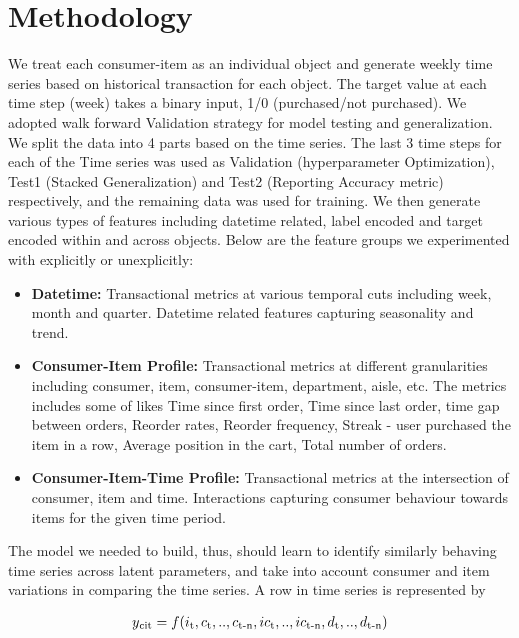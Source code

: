 \section{Methodology}
We treat each consumer-item as an individual object and generate weekly time series based on historical transaction for 
each object. The target value at each time step (week) takes a binary input, 1/0 (purchased/not purchased).
We adopted walk forward Validation strategy for model testing and generalization. We split the data into 4 parts
based on the time series. The last 3 time steps for each of the Time series was used as Validation (hyperparameter Optimization),
Test1 (Stacked Generalization) and Test2 (Reporting Accuracy metric) respectively, and the remaining data was used for training.
We then generate various types of features including datetime related, label encoded and target encoded 
within and across objects. Below are the feature groups we experimented with explicitly or unexplicitly:
\begin{itemize}
\item {\bf Datetime:} Transactional metrics at various temporal cuts including week, month and quarter. 
Datetime related features capturing seasonality and trend.
\item {\bf Consumer-Item Profile:} Transactional metrics at different granularities including consumer, item,
consumer-item, department, aisle, etc. The metrics includes some of likes Time since first order, 
Time since last order, time gap between orders, Reorder rates, Reorder frequency, 
Streak - user purchased the item in a row, Average position in the cart, Total number of orders.
\item {\bf Consumer-Item-Time Profile:} Transactional metrics at the intersection of consumer, item and time.
Interactions capturing consumer behaviour towards items for the given time period.
\end{itemize}
The model we needed to build, thus, should learn to identify similarly behaving time series across latent
parameters, and take into account consumer and item variations in comparing the time series. A row in time series 
is represented by

  \begin{equation}
    \begin{array}{l}
      y\textsubscript{cit}  = f(i\textsubscript{t}, c\textsubscript{t},..,c\textsubscript{t-n}, ic\textsubscript{t}
      ,..,ic\textsubscript{t-n}, d\textsubscript{t},..,d\textsubscript{t-n})
    \end{array}
    \label{eqn:fx}
  \end{equation}

